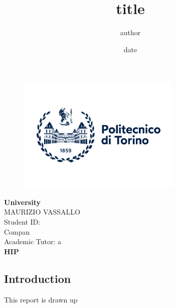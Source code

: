 \documentclass[14pt]{extarticle}
\def\sp{\vspace{5pt}}
\def\ss{\vspace{25pt}}
\begin{document}
\title{title}
\author{author}
\date{date}

\begin{titlepage}
	\begin{figure}[t]
    		\centering\includegraphics[width=0.7\textwidth]{./Image/polito_logo_2021_blu.jpg}
		\vspace{10mm}
	\end{figure}

	\begin{center}
	    	\textbf{ \LARGE{University\\}}
		\ss
		\textnormal{ \Large {MAURIZIO VASSALLO\\}}
		\textnormal{ \large {Student ID: \\}}
		\textnormal{ \large {Compan\\}}
		\textnormal{ \large {Academic Tutor: a\\}}
	    		\vspace{\fill}\textbf{\LARGE{HIP\\}}\vspace*{\fill}%
	\end{center}
	
\end{titlepage}

\tableofcontents
\newpage

\begin{center}
	\section{Introduction}
	\sp
\end{center}
\begin{flushleft}
	This report is drawn up 
	\ss
\end{flushleft}
\end{document}
